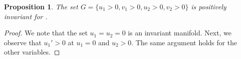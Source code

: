 \documentclass[10pt,a4paper]{amsart}
\newtheorem{prop}{Proposition}
\begin{document}
\begin{prop}
 The set $G=\{u_1>0,v_1>0,u_2>0,v_2>0\}$ is positively invariant for . 
\end{prop}

\begin{proof}
    We note that the set $u_1=u_2=0$ is an invariant manifold. Next, we observe that $u_1'>0$ at $u_1=0$ and $u_2>0$. The same argument holds for the other variables.   
\end{proof}
\end{document}
